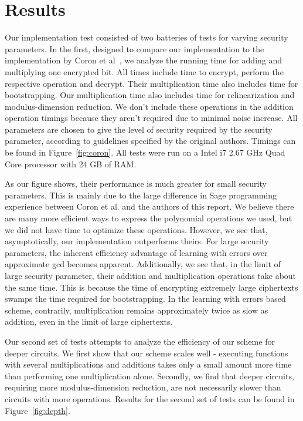 \documentclass[letterpaper,twocolumn,10pt]{article}
\begin{document}
\section{Results}
\label{sec:results}
Our implementation test consisted of two batteries of tests for varying security parameters. In the first, designed to compare our implementation to the implementation by Coron et al~\cite{CNT}, we analyze the running time for adding and multiplying one encrypted bit. All times include time to encrypt, perform the respective operation and decrypt. Their multiplication time also includes time for bootstrapping. Our multiplication time also includes time for relinearization and modulus-dimension reduction. We don't include these operations in the addition operation timings because they aren't required due to minimal noise increase. All parameters are chosen to give the level of security required by the security parameter, according to guidelines specified by the original authors. Timings can be found in Figure~\ref{fig:coron}. All tests were run on a Intel i7 2.67 GHz Quad Core processor with 24 GB of RAM.

As our figure shows, their performance is much greater for small security parameters. This is mainly due to the large difference in Sage programming experience between Coron et al. and the authors of this report. We believe there are many more efficient ways to express the polynomial operations we used, but we did not have time to optimize these operations. However, we see that, asymptotically, our implementation outperforms theirs. For large security parameters, the inherent efficiency advantage of learning with errors over approximate gcd becomes apparent. Additionally, we see that, in the limit of large security parameter, their addition and multiplication operations take about the same time. This is because the time of encrypting extremely large ciphertexts swamps the time required for bootstrapping. In the learning with errors based scheme, contrarily, multiplication remains approximately twice as slow as addition, even in the limit of large ciphertexts.

Our second set of tests attempts to analyze the efficiency of our scheme for deeper circuits. We first show that our scheme scales well - executing functions with several multiplications and additions takes only a small amount more time than performing one multiplication alone. Secondly, we find that deeper circuits, requiring more modulus-dimension reduction, are not necessarily slower than circuits with more operations. Results for the second set of tests can be found in Figure~\ref{fig:depth}.
\end{document}
